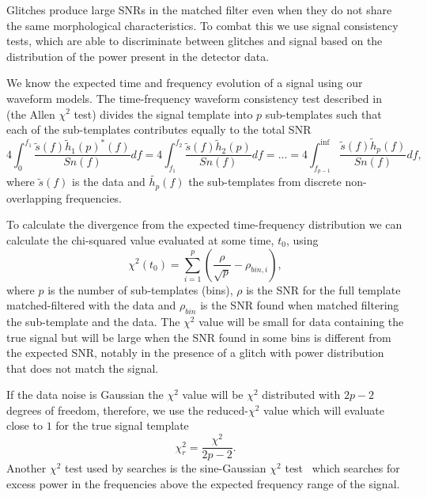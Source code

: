 Glitches produce large SNRs in the matched filter even when they do not share the same morphological characteristics. To combat this we use signal consistency tests, which are able to discriminate between glitches and signal based on the distribution of the power present in the detector data.

We know the expected time and frequency evolution of a \gwadj signal using our waveform models. The time-frequency waveform consistency test described in~\cite{Allen_Chi:2005} (the Allen $\chi^{2}$ test) divides the signal template into $p$ sub-templates such that each of the sub-templates contributes equally to the total SNR
%
\begin{equation}
    4 \int^{f_{1}}_{0}\frac{\tilde{s}(f) \tilde{h}_{1}(p)^*(f)}{Sn(f)}df = 4 \int^{f_{2}}_{f_{1}}\frac{\tilde{s}(f) \tilde{h}_{2}(p)}{Sn(f)}df = ... =  4 \int^{\inf}_{f_{p-1}}\frac{\tilde{s}(f) \tilde{h}_{p}(f)}{Sn(f)}df ,
\end{equation}
%
where $\tilde{s}(f)$ is the data and $\tilde{h_{p}}(f)$ the sub-templates from discrete non-overlapping frequencies.

To calculate the divergence from the expected time-frequency distribution we can calculate the chi-squared value evaluated at some time, $t_{0}$, using
%
\begin{equation}
    \chi^{2}(t_{0}) = \sum^{p}_{i=1} \left(\frac{\rho}{\sqrt{p}} - \rho_{bin, i}\right),
\end{equation}
%
where $p$ is the number of sub-templates (bins), $\rho$ is the SNR for the full template matched-filtered with the data and $\rho_{bin}$ is the SNR found when matched filtering the sub-template and the data. The $\chi^{2}$ value will be small for data containing the true signal but will be large when the SNR found in some bins is different from the expected SNR, notably in the presence of a glitch with power distribution that does not match the signal.

If the data noise is Gaussian the $\chi^{2}$ value will be $\chi^{2}$ distributed with $2p - 2$ degrees of freedom, therefore, we use the reduced-$\chi^{2}$ value which will evaluate close to $1$ for the true signal template
%
\begin{equation}
    \chi_{r}^{2} = \frac{\chi^{2}}{2p-2}.
    \label{2:eq:reduced_chisq}
\end{equation}
%
Another $\chi^{2}$ test used by \gwadj searches is the sine-Gaussian $\chi^{2}$ test~\cite{PyCBC_sg:2018} which searches for excess power in the frequencies above the expected frequency range of the signal.

